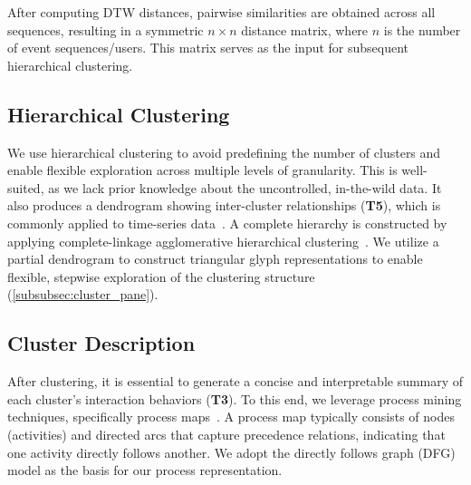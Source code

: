 \documentclass[preprint,journal]{vgtc}            %
\begin{document}
After computing DTW distances, pairwise similarities are obtained across all sequences, resulting in a symmetric $n \times n$ distance matrix, where $n$ is the number of event sequences/users. 
This matrix serves as the input for subsequent hierarchical clustering.



\subsection{Hierarchical Clustering}

We use hierarchical clustering to avoid predefining the number of clusters and enable flexible exploration across multiple levels of granularity.
This is well-suited, as we lack prior knowledge about the uncontrolled, in-the-wild data.
It also produces a dendrogram showing inter-cluster relationships (\textbf{T5}), which is commonly applied to time-series data~\cite{Ali19Clustering}.
A complete hierarchy is constructed by applying complete-linkage agglomerative hierarchical clustering~\cite{Hartigan75Clustering}.
We utilize a partial dendrogram to construct triangular glyph representations to enable flexible, stepwise exploration of the clustering structure (\cref{subsubsec:cluster_pane}).%



\subsection{Cluster Description}

After clustering, it is essential to generate a concise and interpretable summary of each cluster's interaction behaviors (\textbf{T3}).
To this end, we leverage process mining techniques, specifically process maps~\cite{van16Data}.
A process map typically consists of nodes (activities) and directed arcs that capture precedence relations, indicating that one activity directly follows another.
We adopt the directly follows graph (DFG) model as the basis for our process representation.
\end{document}
